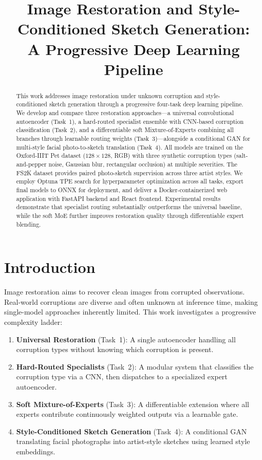 \documentclass[conference]{IEEEtran}
\title{Image Restoration and Style-Conditioned Sketch Generation:\\A Progressive Deep Learning Pipeline}
\author{\IEEEauthorblockN{Aaiz Ur Rehman Kazmi}
\IEEEauthorblockA{FAST-NUCES\\
GitHub: \url{https://github.com/AaizUrRehmanKazmi/GenAI_A1}\\
Models: \url{https://github.com/AaizUrRehmanKazmi/GenAI_A1}\\
Demo: \url{https://youtu.be/6zGzUnhm34M}}}
\begin{document}
\maketitle

\begin{abstract}
This work addresses image restoration under unknown corruption and style-conditioned sketch generation through a progressive four-task deep learning pipeline. We develop and compare three restoration approaches---a universal convolutional autoencoder (Task~1), a hard-routed specialist ensemble with CNN-based corruption classification (Task~2), and a differentiable soft Mixture-of-Experts combining all branches through learnable routing weights (Task~3)---alongside a conditional GAN for multi-style facial photo-to-sketch translation (Task~4). All models are trained on the Oxford-IIIT Pet dataset ($128 \times 128$, RGB) with three synthetic corruption types (salt-and-pepper noise, Gaussian blur, rectangular occlusion) at multiple severities. The FS2K dataset provides paired photo-sketch supervision across three artist styles. We employ Optuna TPE search for hyperparameter optimization across all tasks, export final models to ONNX for deployment, and deliver a Docker-containerized web application with FastAPI backend and React frontend. Experimental results demonstrate that specialist routing substantially outperforms the universal baseline, while the soft MoE further improves restoration quality through differentiable expert blending.
\end{abstract}

\section{Introduction}

Image restoration aims to recover clean images from corrupted observations. Real-world corruptions are diverse and often unknown at inference time, making single-model approaches inherently limited. This work investigates a progressive complexity ladder:

\begin{enumerate}
\item \textbf{Universal Restoration} (Task~1): A single autoencoder handling all corruption types without knowing which corruption is present.
\item \textbf{Hard-Routed Specialists} (Task~2): A modular system that classifies the corruption type via a CNN, then dispatches to a specialized expert autoencoder.
\item \textbf{Soft Mixture-of-Experts} (Task~3): A differentiable extension where all experts contribute continuously weighted outputs via a learnable gate.
\item \textbf{Style-Conditioned Sketch Generation} (Task~4): A conditional GAN translating facial photographs into artist-style sketches using learned style embeddings.
\end{enumerate}
\end{document}
